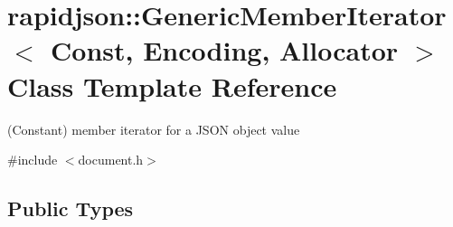 \hypertarget{classrapidjson_1_1_generic_member_iterator}{}\section{rapidjson\+::Generic\+Member\+Iterator$<$ Const, Encoding, Allocator $>$ Class Template Reference}
\label{classrapidjson_1_1_generic_member_iterator}


(Constant) member iterator for a J\+S\+ON object value  




{\ttfamily \#include $<$document.\+h$>$}

\subsection*{Public Types}
